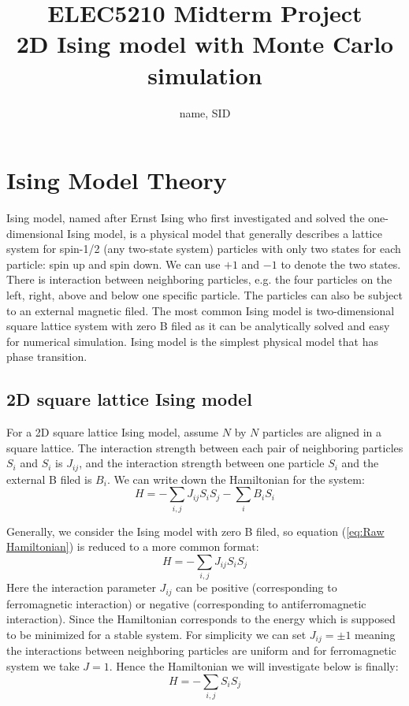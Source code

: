 \documentclass[11pt, a4paper]{article}
\title{ELEC5210 Midterm Project\\2D Ising model with Monte Carlo simulation}
\author{name, SID}
\date{}
\begin{document}
\maketitle


\section{Ising Model Theory}
Ising model, named after Ernst Ising who first investigated and solved the one-dimensional Ising model\cite{Ising1925}, is a physical model that generally describes a lattice system for spin-1/2 (any two-state system) particles with only two states for each particle: spin up and spin down. We can use $+1$ and $-1$ to denote the two states. There is interaction between neighboring particles, e.g. the four particles on the left, right, above and below one specific particle. The particles can also be subject to an external magnetic filed. The most common Ising model is two-dimensional square lattice system with zero B filed as it can be analytically solved and easy for numerical simulation. Ising model is the simplest physical model that has phase transition\cite{gallavotti2013statistical}.

\subsection{2D square lattice Ising model}
For a 2D square lattice Ising model, assume $N$ by $N$ particles are aligned in a square lattice. The interaction strength between each pair of neighboring particles $S_i$ and $S_i$ is $J_{ij}$, and the interaction strength between one particle $S_i$ and the external B filed is $B_i$. We can write down the Hamiltonian for the system\cite{IsingWiki}:
\begin{equation}
H = -\sum\limits_{i, j}J_{ij}S_i S_j - \sum\limits_{i} B_i S_i \label{eq:Raw Hamiltonian}
\end{equation}

Generally, we consider the Ising model with zero B filed, so equation (\ref{eq:Raw Hamiltonian}) is reduced to a more common format:
\begin{equation}
H = -\sum\limits_{i, j}J_{ij}S_i S_j \label{eq:Common Hamiltonian}
\end{equation}
Here the interaction parameter $J_{ij}$ can be positive (corresponding to ferromagnetic interaction) or negative (corresponding to antiferromagnetic interaction). Since the Hamiltonian corresponds to the energy which is supposed to be minimized for a stable system. For simplicity we can set $J_{ij} = \pm 1$ meaning the interactions between neighboring particles are uniform and for ferromagnetic system we take $J = 1$. Hence the Hamiltonian we will investigate below is finally:
\begin{equation}
H = -\sum\limits_{i, j}S_i S_j \label{eq:Final Hamiltonian}
\end{equation}
\end{document}
